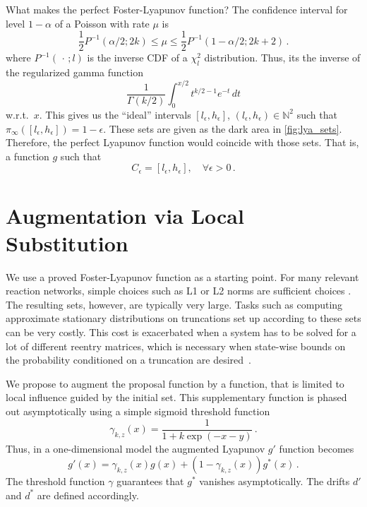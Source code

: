 \begin{example}
What makes the perfect Foster-Lyapunov function?
The confidence interval for level $1-\alpha$ of a Poisson with rate $\mu$ is
\[
\frac{1}{2}P^{-1}(\alpha/2; 2k)\le\mu\leq\frac{1}{2}P^{-1}(1-\alpha/2;{2k+2})\,.
\]
where $P^{-1}(\,\cdot\,; l)$ is the inverse \ac{CDF} of a $\chi^2_{l}$ distribution.
Thus, its the inverse of the regularized gamma function
\[
	\frac{1}{\Gamma(k/2)}\int_0^{x/2} t^{k/2 - 1} e^{-t}\,dt
\]
w.r.t.\ $x$.
	This gives us the ``ideal'' intervals $[l_{\epsilon},h_{\epsilon}]$, $(l_{\epsilon},h_{\epsilon})\in\mathbb{N}^2$ such that
	$\pi_{\infty}([l_{\epsilon},h_{\epsilon}])=1-\epsilon$. These sets are given as the dark area in \autoref{fig:lya_sets}.
Therefore, the perfect Lyapunov function would coincide with those sets. That is,
a function $g$ such that
\[
	C_{\epsilon}
	=
	\left[l_{\epsilon}, h_{\epsilon}\right], \quad \forall\epsilon> 0\,.
\]
\end{example}

\section{Augmentation via Local Substitution}
We use a proved Foster-Lyapunov function as a starting point.
For many relevant reaction networks, simple choices such as L1 or L2 norms are sufficient choices \parencite{spieler2014numerical}.
The resulting sets, however, are typically very large.
Tasks such as computing approximate stationary distributions on truncations set up according to these sets can be very costly.
This cost is exacerbated when a system has to be solved for a lot of different reentry matrices, which is necessary when state-wise bounds on the probability conditioned on a truncation are desired~\parencite{dayar2011bounding}.

We propose to augment the proposal function by a function, that is limited to local influence guided by the initial set.
This supplementary function is phased out asymptotically using a simple sigmoid threshold function
\begin{equation}\label{eq:threshold}
  \gamma_{k,z}(x) = \frac{1}{1+k\exp(-x - y)}\,.
\end{equation}
Thus, in a one-dimensional model the augmented Lyapunov $g'$ function becomes
\begin{equation}\label{eq:thres_lyapunov}
    g'(x) = \gamma_{k,z}(x) g(x) + (1 - \gamma_{k,z}(x)) g^*(x)\,.
\end{equation}
The threshold function $\gamma$ guarantees that $g^*$ vanishes asymptotically.
The drifts $d'$ and $d^*$ are defined accordingly.

